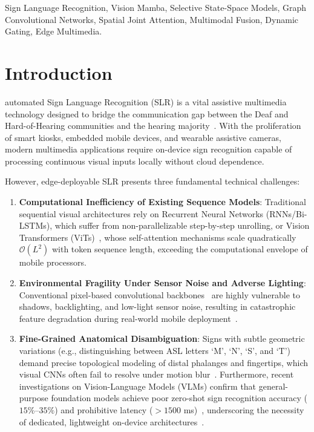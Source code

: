 \documentclass[journal]{IEEEtran}
\begin{document}
\begin{IEEEkeywords}
Sign Language Recognition, Vision Mamba, Selective State-Space Models, Graph Convolutional Networks, Spatial Joint Attention, Multimodal Fusion, Dynamic Gating, Edge Multimedia.
\end{IEEEkeywords}

\section{Introduction}
 automated Sign Language Recognition (SLR) is a vital assistive multimedia technology designed to bridge the communication gap between the Deaf and Hard-of-Hearing communities and the hearing majority~\cite{camgoz2020signbert, isharah2026tmm}. With the proliferation of smart kiosks, embedded mobile devices, and wearable assistive cameras, modern multimedia applications require on-device sign recognition capable of processing continuous visual inputs locally without cloud dependence. 

However, edge-deployable SLR presents three fundamental technical challenges:
\begin{enumerate}
    \item \textbf{Computational Inefficiency of Existing Sequence Models}: Traditional sequential visual architectures rely on Recurrent Neural Networks (RNNs/Bi-LSTMs), which suffer from non-parallelizable step-by-step unrolling, or Vision Transformers (ViTs)~\cite{mehta2022mobilevit}, whose self-attention mechanisms scale quadratically $\mathcal{O}(L^2)$ with token sequence length, exceeding the computational envelope of mobile processors.
    \item \textbf{Environmental Fragility Under Sensor Noise and Adverse Lighting}: Conventional pixel-based convolutional backbones~\cite{howard2019mobilenetv3, liu2022convnet} are highly vulnerable to shadows, backlighting, and low-light sensor noise, resulting in catastrophic feature degradation during real-world mobile deployment~\cite{translate2026tmm}.
    \item \textbf{Fine-Grained Anatomical Disambiguation}: Signs with subtle geometric variations (e.g., distinguishing between ASL letters `M', `N', `S', and `T') demand precise topological modeling of distal phalanges and fingertips, which visual CNNs often fail to resolve under motion blur~\cite{zuo2023nla, hu2023signbert}. Furthermore, recent investigations on Vision-Language Models (VLMs) confirm that general-purpose foundation models achieve poor zero-shot sign recognition accuracy ($15\%$--$35\%$) and prohibitive latency ($>1500$ ms)~\cite{javorek2026slr}, underscoring the necessity of dedicated, lightweight on-device architectures~\cite{carneiro2024deep}.
\end{enumerate}
\end{document}
